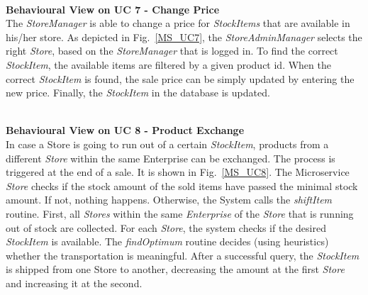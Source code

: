        
		
		\noindent
		\\
		\textbf{Behavioural View on UC 7 - Change Price} \\
		The \textit{StoreManager} is able to change a price for \textit{StockItems} that are available in his/her store. As depicted in Fig.~\ref{MS_UC7}, the \textit{StoreAdminManager} selects the right \textit{Store}, based on the \textit{StoreManager} that is logged in. To find the correct \textit{StockItem}, the available items are filtered by a given product id. When the correct \textit{StockItem} is found, the sale price can be simply updated by entering the new price. Finally, the \textit{StockItem} in the database is updated.
		
		\noindent
		\\
		\textbf{Behavioural View on UC 8 - Product Exchange} \\
		In case a Store is going to run out of a certain \textit{StockItem}, products from a different \textit{Store} within the same Enterprise can be exchanged. The process  is triggered at the end of a sale. It is shown in  Fig.~\ref{MS_UC8}. The Microservice \textit{Store} checks if the stock amount of the sold items have passed the minimal stock amount. If not, nothing happens. Otherwise, the System calls the \textit{shiftItem} routine. First, all \textit{Stores} within the same \textit{Enterprise} of the \textit{Store} that is running out of stock are collected. For each \textit{Store}, the system checks if the desired \textit{StockItem} is available. The \textit{findOptimum} routine decides (using heuristics) whether the transportation is meaningful. After a successful query, the \textit{StockItem} is shipped from one Store to another, decreasing the amount at the first \textit{Store} and increasing it at the second.

